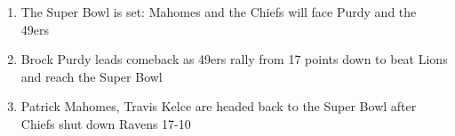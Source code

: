 \begin{enumerate}
\item The Super Bowl is set: Mahomes and the Chiefs will face Purdy and the 49ers
\item Brock Purdy leads comeback as 49ers rally from 17 points down to beat Lions and reach the Super Bowl
\item Patrick Mahomes, Travis Kelce are headed back to the Super Bowl after Chiefs shut down Ravens 17-10\end{enumerate}